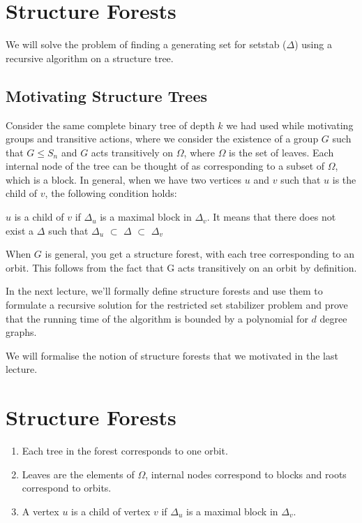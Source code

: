 \section{Structure Forests}

We will solve the problem of finding a generating set for setstab ($\Delta$) using a recursive algorithm on a structure tree.

\subsection{Motivating Structure Trees}

Consider the same complete binary tree of depth $k$ we had used while motivating groups and transitive actions, where we consider the existence of a group $G$ such that $G \leqslant S_{n}$ and $G$ acts transitively on $\Omega$, where $\Omega$ is the set of leaves. Each internal node of the tree can be thought of as corresponding to a subset of $\Omega$, which is a block. In general, when we have two vertices $u$ and $v$ such that $u$ is the child of $v$, the following condition holds:
\begin{center}
$u$ is a child of $v$ if $\Delta_{u}$ is a maximal block in $\Delta_{v}$. It means that there does not exist a $\Delta$ such that $\Delta_{u}$ $\subset$ $\Delta$ $\subset$ $\Delta_{v}$ 
\end{center}

\begin{observation} 
When $G$ is general, you get a structure forest, with each tree corresponding to an orbit. This follows from the fact that G acts transitively on an orbit by definition. 
\end{observation}

In the next lecture, we'll formally define structure forests and use them to formulate a recursive solution for the restricted set stabilizer problem and prove that the running time of the algorithm is bounded by a polynomial for $d$ degree graphs.


We will formalise the notion of structure forests that we motivated in the last lecture.

\section{Structure Forests}
\begin{enumerate}
\item Each tree in the forest corresponds to one orbit.
\item Leaves are the elements of $\Omega$, internal nodes correspond to blocks and roots correspond to orbits.
\item A vertex $u$ is a child of vertex $v$ if $\Delta_{u}$ is a maximal block in $\Delta_{v}$.
\end{enumerate}


